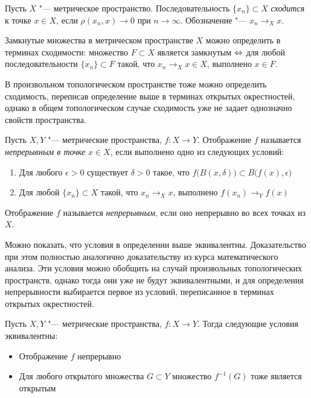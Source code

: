 \begin{definition}
	Пусть $X$ "--- метрическое пространство. Последовательность $\{x_n\} \subset X$ \textit{сходится} к точке $x \in X$, если $\rho(x_n, x) \to 0$ при $n \to \infty$. Обозначение "--- $x_n \to_X x$.
\end{definition}

\begin{note}
	Замкнутые множества в метрическом пространстве $X$ можно определить в терминах сходимости: множество $F \subset X$ является замкнутым $\Leftrightarrow$ для любой последовательности $\{x_n\} \subset F$ такой, что $x_n \to_X x \in X$, выполнено $x \in F$.
\end{note}

\begin{note}
	В произвольном топологическом пространстве тоже можно определить сходимость, переписав определение выше в терминах открытых окрестностей, однако в общем топологическом случае сходимость уже не задает однозначно свойств пространства.
\end{note}

\begin{definition}
	Пусть $X, Y$ "--- метрические пространства, $f : X \to Y$. Отображение $f$ называется \textit{непрерывным в точке} $x \in X$, если выполнено одно из следующих условий:
	\begin{enumerate}
		\item Для любого $\epsilon > 0$ существует $\delta > 0$ такое, что $f\big(B(x, \delta)\big) \subset B\big(f(x), \epsilon\big)$
		
		\item Для любой $\{x_n\} \subset X$ такой, что $x_n \to_X x$, выполнено $f(x_n) \to_Y f(x)$
	\end{enumerate}

	Отображение $f$ называется \textit{непрерывным}, если оно непрерывно во всех точках из $X$.
\end{definition}

\begin{note}
	Можно показать, что условия в определении выше эквивалентны. Доказательство при этом полностью аналогично доказательству из курса математического анализа. Эти условия можно обобщить на случай произвольных топологических пространств, однако тогда они уже не будут эквивалентными, и для определения непрерывности выбирается первое из условий, переписанное в терминах открытых окрестностей.
\end{note}

\begin{theorem}\label{thm1.4}
	Пусть $X, Y$ "--- метрические пространства, $f: X \to Y$. Тогда следующие условия эквивалентны:
	\begin{itemize}
		\item Отображение $f$ непрерывно
		\item Для любого открытого множества $G \subset Y$ множество $f^{-1}(G)$ тоже является открытым
	\end{itemize}
\end{theorem}

